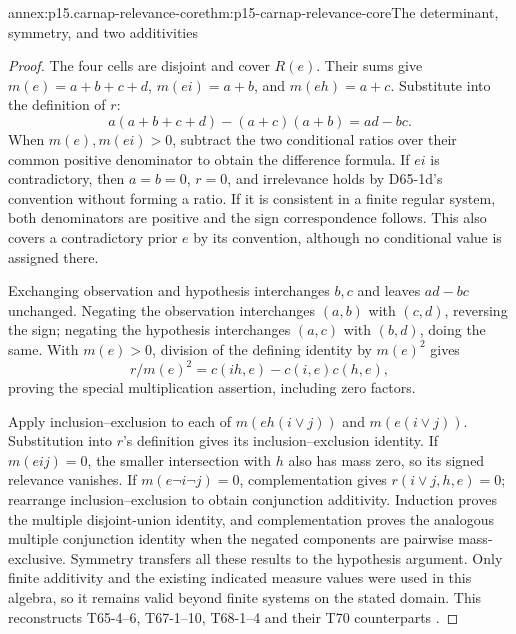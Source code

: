 \begin{annexitem}{annex:p15.carnap-relevance-core}{thm:p15-carnap-relevance-core}{The determinant, symmetry, and two additivities}
\begin{proof}
The four cells are disjoint and cover \(R(e)\). Their sums give
\(m(e)=a+b+c+d\), \(m(ei)=a+b\), and
\(m(eh)=a+c\). Substitute into the definition of \(r\):
\[
 a(a+b+c+d)-(a+c)(a+b)=ad-bc.
\]
When \(m(e),m(ei)>0\), subtract the two conditional ratios
over their common positive denominator to obtain the difference formula.
If \(ei\) is contradictory, then \(a=b=0\), \(r=0\),
and irrelevance holds by D65-1d's convention without forming a ratio.
If it is consistent in a finite regular system, both denominators are
positive and the sign correspondence follows. This also covers a
contradictory prior \(e\) by its convention, although no conditional
value is assigned there.

Exchanging observation and hypothesis interchanges \(b,c\) and
leaves \(ad-bc\) unchanged. Negating the observation interchanges
\((a,b)\) with \((c,d)\), reversing the sign; negating the
hypothesis interchanges \((a,c)\) with \((b,d)\), doing the
same. With \(m(e)>0\), division of the defining identity by
\(m(e)^2\) gives
\[
 r/m(e)^2=c(ih,e)-c(i,e)c(h,e),
\]
proving the special multiplication assertion, including zero factors.

Apply inclusion--exclusion to each of
\(m(eh(i\lor j))\) and \(m(e(i\lor j))\). Substitution
into \(r\)'s definition gives its inclusion--exclusion identity.
If \(m(eij)=0\), the smaller intersection with \(h\) also
has mass zero, so its signed relevance vanishes. If
\(m(e\neg i\neg j)=0\), complementation gives
\(r(i\lor j,h,e)=0\); rearrange inclusion--exclusion to obtain
conjunction additivity. Induction proves the multiple disjoint-union
identity, and complementation proves the analogous multiple conjunction
identity when the negated components are pairwise mass-exclusive.
Symmetry transfers all these results to the hypothesis argument. Only
finite additivity and the existing indicated measure values were used
in this algebra, so it remains valid beyond finite systems on the stated
domain. This reconstructs T65-4--6, T67-1--10, T68-1--4 and their
T70 counterparts \cite{Carnap1950Probability}.
\end{proof}
\end{annexitem}

